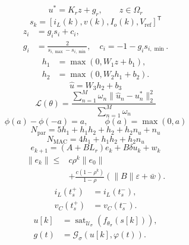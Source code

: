 \begin{equation}u^*=K_r z+g_r,\qquad z\in\Omega_r\end{equation}
\begin{equation}s_k=[i_L(k),v(k),I_o(k),V_{\mathrm{ref}}]^{\mathsf T}\end{equation}
\begin{equation}\begin{aligned}z_i&=g_i s_i+c_i,\\ g_i&=\frac{2}{s_{i,\max}-s_{i,\min}},\quad c_i=-1-g_i s_{i,\min}.\end{aligned}\end{equation}
\begin{equation}\begin{aligned}h_1&=\max(0,W_1z+b_1),\\h_2&=\max(0,W_2h_1+b_2).\end{aligned}\end{equation}
\begin{equation}\hat u=W_3h_2+b_3\end{equation}
\begin{equation}\mathcal L(\theta)=\frac{\sum_{n=1}^{M}\omega_n\|\hat u_n-u_n^*\|_2^2}{\sum_{n=1}^{M}\omega_n}\end{equation}
\begin{equation}\phi(a)-\phi(-a)=a,\qquad \phi(a)=\max(0,a)\end{equation}
\begin{equation}N_{\mathrm{par}}=5h_1+h_1h_2+h_2+h_2n_u+n_u\end{equation}
\begin{equation}N_{\mathrm{MAC}}=4h_1+h_1h_2+h_2n_u\end{equation}
\begin{equation}e_{k+1}=(A+BL_r)e_k+B\delta u_k+w_k\end{equation}
\begin{equation}\begin{aligned}\|e_k\|\le{}&c\rho^k\|e_0\|\\ &+\frac{c(1-\rho^k)}{1-\rho}(\|B\|\varepsilon+\bar w).\end{aligned}\end{equation}
\begin{equation}\begin{aligned}i_L(t_s^+)&=i_L(t_s^-),\\ v_C(t_s^+)&=v_C(t_s^-).\end{aligned}\end{equation}
\begin{equation}\begin{aligned}u[k]&=\operatorname{sat}_{\mathcal U_\sigma}(f_{\theta_\sigma}(s[k])),\\g(t)&=\mathcal G_\sigma(u[k],\varphi(t)).\end{aligned}\end{equation}
